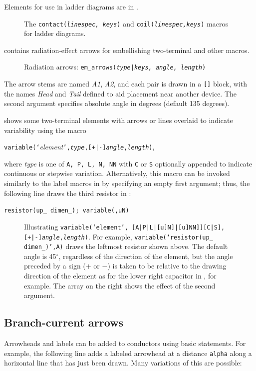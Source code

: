 Elements for use in ladder diagrams are in .
\begin{figure}[H]
   
   \caption{The {\tt contact({\sl linespec, keys})} and
    {\tt coil({\sl linespec,keys})} macros for ladder diagrams.}
   \label{Ladder}
   \end{figure}

 contains radiation-effect arrows for embellishing two-terminal
and other macros.
\begin{figure}[H]
   
   \caption{Radiation arrows: {\tt em\_arrows({\sl type}|{\sl keys,%
     angle, length})}}
   \label{Emarrows}
   \end{figure}
The arrow stems are named {\sl A1}, {\sl A2},
and each pair is drawn in a \verb|[]| block, with
the names {\sl Head} and {\sl Tail} defined to
aid placement near another device.  The second argument specifies
absolute angle in degrees (default 135 degrees).

 shows some two-terminal elements with
arrows or lines overlaid to indicate variability using the macro
\par
{\tt variable(`}{\sl element}{\tt',{\sl type},[+|-]{\sl angle},{\sl length})},

\noindent
where {\sl type} is one of {\tt A, P, L, N, NN} with {\tt C} or {\tt S}
optionally appended to indicate continuous or stepwise variation.
Alternatively, this macro
can be invoked similarly to the label macros in
 by specifying an empty first argument;
thus, the following line draws the third resistor in :
\par
   {\tt resistor(up\_ dimen\_); variable(,uN)}

\begin{figure}[H]
\vspace*{-\baselineskip}
   
   \caption{Illustrating
{\tt variable(`{\sl element}',%
[A|P|L|[u]N]|[u]NN]][C|S],[+|-]{\sl angle},{\sl length})}.
   For example, {\tt variable(`resistor(up\_ dimen\_)',A)} draws
   the leftmost resistor shown above.
   The default angle is 45${}^{\circ}$, regardless of the direction of
   the element, but the angle preceded by a sign ($+$ or $-$) is taken
   to be relative to the drawing direction of the element as for the
   lower right capacitor in , for example.  The array on
   the right shows the effect of the second argument.}
   \label{Variable}
   \end{figure}

\subsection{Branch-current arrows\label{Branchcurrent:}}
Arrowheads and labels can be added to conductors using basic
\pic statements.  For example, the following line adds a labeled
arrowhead at a distance {\tt alpha} along a horizontal line that has
just been drawn.  Many variations of this are possible:

